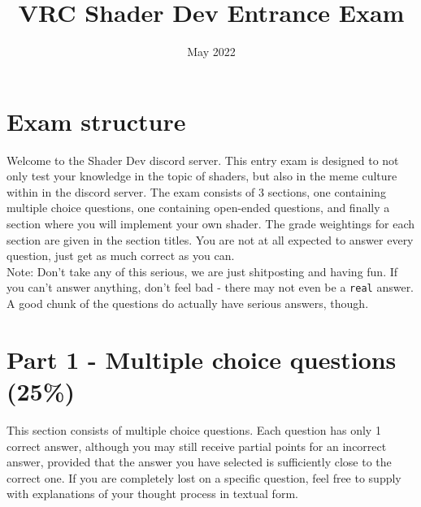 \documentclass{exam}
\title{VRC Shader Dev Entrance Exam}
\date{May 2022}
\begin{document}
\maketitle

\section*{Exam structure}
Welcome to the Shader Dev discord server. This entry exam is designed to not only test your knowledge in the topic of shaders, but also in the meme culture within in the discord server. The exam consists of 3 sections, one containing multiple choice questions, one containing open-ended questions, and finally a section where you will implement your own shader. The grade weightings for each section are given in the section titles. You are not at all expected to answer every question, just get as much correct as you can.\\

Note: Don't take any of this serious, we are just shitposting and having fun. If you can't answer anything, don't feel bad - there may not even be a \texttt{real} answer. A good chunk of the questions do actually have serious answers, though.

\section*{Part 1 - Multiple choice questions (25\%)}
This section consists of multiple choice questions. Each question has only 1 correct answer, although you may still receive partial points for an incorrect answer, provided that the answer you have selected is sufficiently close to the correct one. If you are completely lost on a specific question, feel free to supply with explanations of your thought process in textual form.
\end{document}
